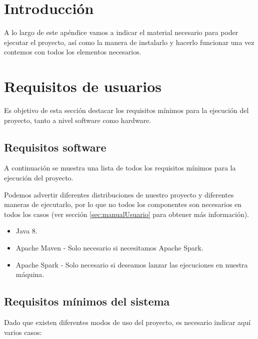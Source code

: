 
\section{Introducción}

A lo largo de este apéndice vamos a indicar el material necesario para poder ejecutar el proyecto, así como la manera de instalarlo y hacerlo funcionar una vez contemos con todos los elementos necesarios.

\section{Requisitos de usuarios}

Es objetivo de esta sección destacar los requisitos mínimos para la ejecución del proyecto, tanto a nivel software como hardware.

\subsection{Requisitos software}\label{sec:ReqSoftware}

A continuación se muestra una lista de todos los requisitos mínimos para la ejecución del proyecto.

Podemos advertir diferentes distribuciones de nuestro proyecto y diferentes maneras de ejecutarlo, por lo que no todos los componentes son necesarios en todos los casos (ver sección \ref{sec:manualUsuario} para obtener más información).

\begin{itemize}
\item Java 8.
\item Apache Maven - Solo necesario si necesitamos Apache Spark.
\item Apache Spark - Solo necesario si deseamos lanzar las ejecuciones en nuestra máquina.
\end{itemize}

\subsection{Requisitos mínimos del sistema}

Dado que existen diferentes modos de uso del proyecto, es necesario indicar aquí varios casos:

